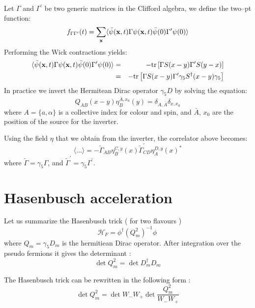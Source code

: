 \documentclass{article}[12pt]
\def\bfx{{\bf x}}
\begin{document}
\noindent
Let $\Gamma$ and $\Gamma^\prime$ be two generic matrices in the
Clifford algebra, we define the two--pt function:
%
\begin{equation}
f_{\Gamma\Gamma^\prime}(t) = \sum_\bfx \langle \bar\psi(\bfx,t) \Gamma
\psi(\bfx,t) \bar\psi(0) \Gamma^\prime \psi(0) \rangle
\end{equation}
%
Performing the Wick contractions yields:
%
\begin{eqnarray}
\langle \bar\psi(\bfx,t) \Gamma
\psi(\bfx,t) \bar\psi(0) \Gamma^\prime \psi(0) \rangle &=&
- \mathrm{tr} \left[ \Gamma S(x-y) \Gamma^\prime S(y-x) \right] 
\nonumber \\
&=& - \mathrm{tr} \left[ \Gamma S(x-y) \Gamma^\prime \gamma_5 
S^\dagger(x-y) \gamma_5 \right] \nonumber 
\end{eqnarray}
%
In practice we invert the Hermitean Dirac operator $\gamma_5 D$ by
solving the equation:
%
\begin{equation}
Q_{AB}(x-y) \eta^{\bar A,x_0}_B(y) = \delta_{A,\bar A} \delta_{x,x_0}
\end{equation}
%
where $A=\{a,\alpha\}$ is a collective index for colour and spin, and
$\bar A$, $x_0$ are the position of the source for the inverter. 

Using the field $\eta$ that we obtain from the inverter, the
correlator above becomes:
%
\begin{equation}
\langle \ldots \rangle = - \tilde \Gamma_{AB} \eta^{C,y}_B(x)
\tilde \Gamma^\prime_{CD} \eta^{D,y}_A(x)^*
\end{equation}
where $\tilde \Gamma= \gamma_5 \Gamma$, and $\tilde \Gamma^\prime =
\gamma_5 \Gamma^\prime$.

\section{Hasenbusch acceleration}


Let us summarize the Hasenbusch trick ( for two flavours )
\begin{equation}
\mathcal{H}_F = \phi^\dagger ( Q_m^2 )^{-1} \phi \,
\end{equation}
where $Q_m =\gamma_5 D_m$ is the hermitiean Dirac operator.
After integration over the pseudo fermions it gives the determinant :
\begin{equation}
\det{ Q_m ^2 } = \det{D_m^{\dagger} D_m}
\end{equation}

The Hasenbusch trick can be rewritten in the following form :
\begin{equation}
\det{ Q_m ^2 }  = \det{W_- W_+} \det{\frac{ Q_m^2}{W_- W_+}}
\end{equation}
\end{document}
